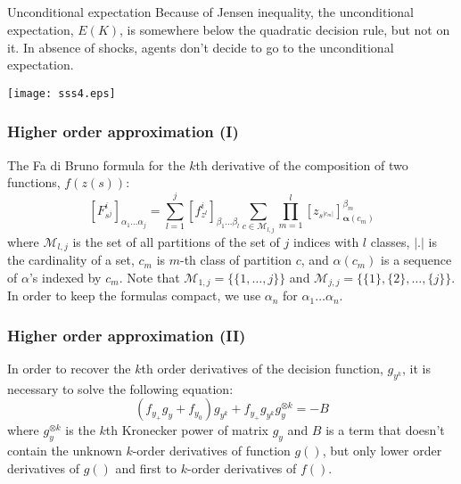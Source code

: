 \documentclass{beamer}
\begin{document}
\subsection[]{}
\begin{slide}{Unconditional expectation}
{\tiny
Because of Jensen inequality, the unconditional expectation, $E(K)$, is somewhere below the quadratic decision rule, but not on it. In absence of shocks, agents don't decide to go to the unconditional expectation.
}
\begin{center}
\texttt{[image: sss4.eps]}  
\end{center}
\end{slide}

\begin{frame}
  \frametitle{Higher order approximation (I)}
  The Fa di Bruno formula for the $k$th derivative of the composition
  of two functions, $f(z(s))$:
\[
\left[F^i_{s^j}\right]_{\alpha_1\ldots\alpha_j} =
\sum_{l=1}^j\left[f^i_{z^l}\right]_{\beta_1\ldots\beta_l}\sum_{c \in{\mathcal
M}_{l,j}}\prod_{m=1}^l\left[z_{s^{|c_m|}}\right]^{\beta_m}_{\boldsymbol{\alpha}(c_m)}
\]
where ${\mathcal M}_{l,j}$ is the set of all partitions of the set of
$j$ indices with $l$ classes, $|.|$ is the cardinality of a set, $c_m$
is $m$-th class of partition $c$, and {\boldmath $\alpha$}$(c_m)$ is a
sequence of $\alpha$'s indexed by $c_m$.  Note that ${\mathcal
  M}_{1,j} = \{\{1,\ldots,j\}\}$ and ${\mathcal M}_{j,j} = \{\{1\},
\{2\}, \ldots, \{j\}\}$.  In order to keep the formulas compact, we
use {\boldmath $\alpha$}$_n$ for $\alpha_1\ldots\alpha_n$.

\end{frame}

\begin{frame}
  \frametitle{Higher order approximation (II)}
  In order to recover the $k$th
order derivatives of the decision function, $g_{y^k}$, it is necessary
to solve the following equation:
\[
\left(f_{y_+}g_y+f_{y_0}\right)g_{y^k}+f_{y_+}g_{y^k}g_y^{\otimes
  k}=-B
\]
where $g_y^{\otimes k}$ is the $k$th Kronecker power of matrix $g_y$
and $B$ is a term that doesn't contain the unknown $k$-order
derivatives of function $g()$, but only lower order derivatives of
$g()$ and first to $k$-order derivatives of $f()$.
\end{frame}
\end{document}
